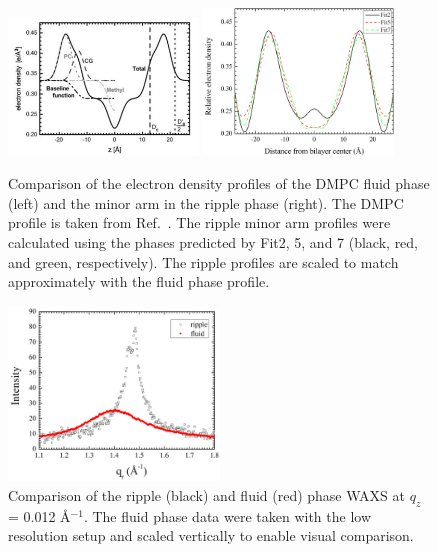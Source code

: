 \begin{figure}[htbp]
  \centering
  \includegraphics[width=0.45\textwidth]{figures/ripple/discussion/Kucerka_fluid_DMPC}
  \includegraphics[width=0.45\textwidth]{figures/ripple/discussion/minor_edp}
  \caption{Comparison of the electron density profiles of the DMPC fluid phase (left)
  and the minor arm in the ripple phase (right). The DMPC profile is taken from 
  Ref.~\cite{Kucerka05_BPJ}. The ripple minor arm profiles were calculated 
  using the phases predicted by Fit2, 5, and 7 (black, red, and green, respectively). 
  The ripple profiles are scaled to match approximately
  with the fluid phase profile.}
  \label{fig:fluid_comparison}
\end{figure}

\begin{figure}[htbp]
  \centering
  \includegraphics[width=0.5\textwidth]{figures/ripple/nGIWAXS/fluid_vs_ripple}
  \caption{Comparison of the ripple (black) and fluid (red) phase WAXS at $q_z$ = 0.012 \AA$^{-1}$.
  The fluid phase data were taken with the low resolution setup and scaled 
  vertically to enable visual comparison.}
  \label{fig:fluid_vs_ripple}
\end{figure}

